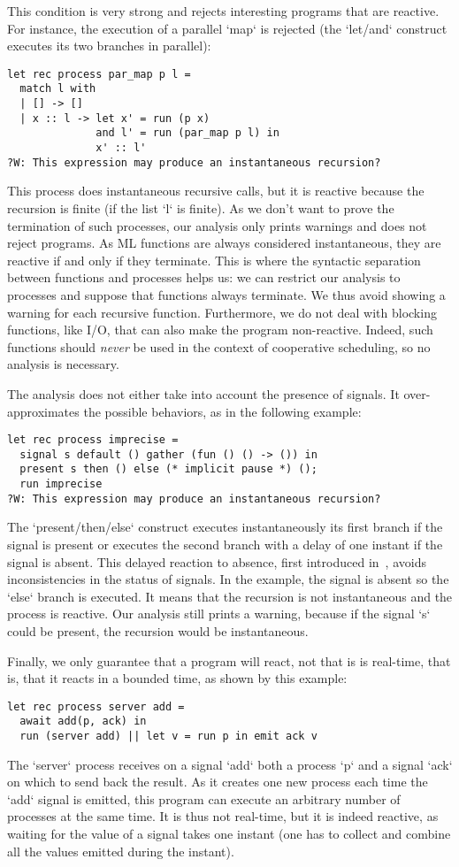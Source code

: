 \documentclass[9pt,preprint]{sigplanconf}
\begin{document}
This condition is very strong and rejects interesting programs that are reactive. For instance, the execution of a parallel `map` is rejected (the `let/and` construct executes its two branches in parallel):
\begin{lstlisting}
let rec process par_map p l =
  match l with
  | [] -> []
  | x :: l -> let x' = run (p x)
              and l' = run (par_map p l) in
              x' :: l'
?W: This expression may produce an instantaneous recursion?
\end{lstlisting}
This process does instantaneous recursive calls, but it is reactive because the recursion is finite (if the list `l` is finite). As we don't want to prove the termination of such processes, our analysis only prints warnings and does not reject programs. As ML functions are always considered instantaneous, they are reactive if and only if they terminate. This is where the syntactic separation between functions and processes helps us: we can restrict our analysis to processes and suppose that functions always terminate.
We thus avoid showing a warning for each recursive function.
%
Furthermore, we do not deal with blocking functions, like I/O, that can also make the program non-reactive. Indeed, such functions should \emph{never} be used in the context of cooperative scheduling, so no analysis is necessary.

The analysis does not either take into account the presence of signals. It over-approximates the possible behaviors, as in the following example:
\begin{lstlisting}
let rec process imprecise =
  signal s default () gather (fun () () -> ()) in
  present s then () else (* implicit pause *) ();
  run imprecise
?W: This expression may produce an instantaneous recursion?
\end{lstlisting}
%
The `present/then/else` construct executes instantaneously its first branch if the signal is present or executes the second branch with a delay of one instant if the signal is absent. This delayed reaction to absence, first introduced in~\cite{Boussinot:1991}, avoids inconsistencies in the status of signals. In the example, the signal is absent so the `else` branch is executed. It means that the recursion is not instantaneous and the process is reactive. Our analysis still prints a warning, because if the signal `s` could be present, the recursion would be instantaneous.

Finally, we only guarantee that a program will react, not that is is real-time, that is, that it reacts in a bounded time, as shown by this example:
\begin{lstlisting}
let rec process server add =
  await add(p, ack) in
  run (server add) || let v = run p in emit ack v
\end{lstlisting}
%
The `server` process receives on a signal `add` both a process `p` and a signal `ack` on which to send back the result. As it creates one new process each time the `add` signal is emitted, this program can execute an arbitrary number of processes at the same time. It is thus not real-time, but it is indeed reactive, as waiting for the value of a signal takes one instant (one has to collect and combine all the values emitted during the instant).
\end{document}
